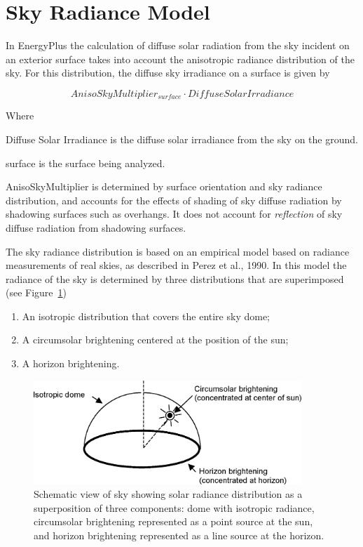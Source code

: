 \section{Sky Radiance Model}\label{sky-radiance-model}

In EnergyPlus the calculation of diffuse solar radiation from the sky incident on an exterior surface takes into account the anisotropic radiance distribution of the sky. For this distribution, the diffuse sky irradiance on a surface is given by

\begin{equation}
AnisoSkyMultiplie{r_{surface}}\cdot DiffuseSolarIrradiance
\end{equation}

Where

Diffuse Solar Irradiance is the diffuse solar irradiance from the sky on the ground.

surface is the surface being analyzed.

AnisoSkyMultiplier is determined by surface orientation and sky radiance distribution, and accounts for the effects of shading of sky diffuse radiation by shadowing surfaces such as overhangs. It does not account for \emph{reflection} of sky diffuse radiation from shadowing surfaces.

The sky radiance distribution is based on an empirical model based on radiance measurements of real skies, as described in Perez et al., 1990. In this model the radiance of the sky is determined by three distributions that are superimposed (see Figure~\ref{fig:schematic-view-of-sky-showing-solar-radiance})

\begin{enumerate}
\def\labelenumi{(\arabic{enumi})}
\item
  An isotropic distribution that covers the entire sky dome;
\item
  A circumsolar brightening centered at the position of the sun;
\item
  A horizon brightening.
\end{enumerate}

\begin{figure}[hbtp] %
\centering
\includegraphics[width=0.9\textwidth, height=0.9\textheight, keepaspectratio=true]{media/image589.png}
\caption{Schematic view of sky showing solar radiance distribution as a superposition of three components: dome with isotropic radiance, circumsolar brightening represented as a point source at the sun, and horizon brightening represented as a line source at the horizon. \protect \label{fig:schematic-view-of-sky-showing-solar-radiance}}
\end{figure}

